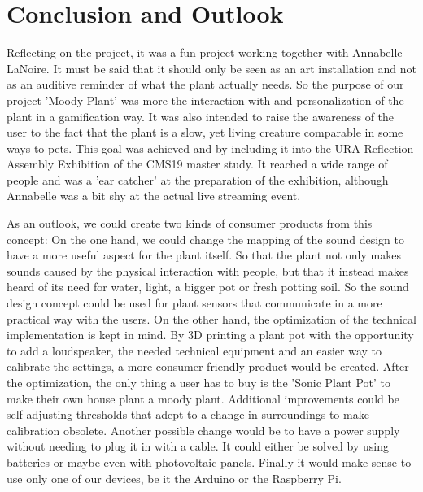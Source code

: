 \section{Conclusion and Outlook}

Reflecting on the project, it was a fun project working together with Annabelle LaNoire. It must be said that it should only be seen as an art installation and not as an auditive reminder of what the plant actually needs.  So the purpose of our project 'Moody Plant' was more the interaction with and personalization of the plant in a gamification way. It was also intended to raise the awareness of the user to the fact that the plant is a slow, yet living creature comparable in some ways to pets. 
This goal was achieved and by including it into the URA Reflection Assembly Exhibition of the CMS19 master study. It reached a wide range of people and was a 'ear catcher' at the preparation of the exhibition, although Annabelle was a bit shy at the actual live streaming event. 

As an outlook, we could create two kinds of consumer products from this concept: 
On the one hand, we could change the mapping of the sound design to have a more useful aspect for the plant itself. So that the plant not only makes sounds caused by the physical interaction with people, but that it instead makes heard of its need for water, light, a bigger pot or fresh potting soil. So the sound design concept could be used for plant sensors that communicate in a more practical way with the users.   
On the other hand, the optimization of the technical implementation is kept in mind. By 3D printing a plant pot with the opportunity to add a loudspeaker, the needed technical equipment and an easier way to calibrate the settings, a more consumer friendly product would be created. After the optimization, the only thing a user has to buy is the 'Sonic Plant Pot' to make their own house plant a moody plant. Additional improvements could be self-adjusting thresholds that adept to a change in surroundings to make calibration obsolete. Another possible change would be to have a power supply without needing to plug it in with a cable. It could either be solved by using batteries or maybe even with photovoltaic panels. Finally it would make sense to use only one of our devices, be it the Arduino or the Raspberry Pi.